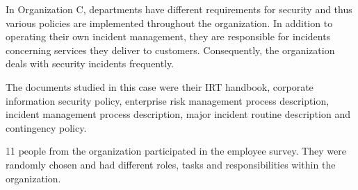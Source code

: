 In Organization C, departments have different requirements for security and thus various policies are implemented throughout the organization. In addition to operating their own incident management, they are responsible for incidents concerning services they deliver to customers. Consequently, the organization deals with security incidents frequently. 

The documents studied in this case were their \ac{IRT} handbook, corporate information security policy, enterprise risk management process description, incident management process description, major incident routine description and contingency policy.

11 people from the organization participated in the employee survey. They were randomly chosen and had different roles, tasks and responsibilities within the organization.